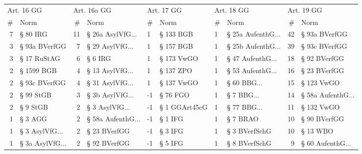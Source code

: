 \vspace{3mm}
\begin{tabular}{rlrlllllrl}
\toprule
\multicolumn{2}{l}{Art. 16 GG} & \multicolumn{2}{l}{Art. 16a GG} & \multicolumn{2}{l}{Art. 17 GG} & \multicolumn{2}{l}{Art. 18 GG} & \multicolumn{2}{l}{Art. 19 GG} \\
         \# &              Norm &           \# &                Norm &          \# &          Norm &          \# &                Norm &          \# &                Norm \\
\midrule
         7 &          § 80 IRG &          11 &  § 26a AsylVfG... &          1 &     § 133 BGB &          1 & § 25a AufenthG... &         42 &       § 93a BVerfGG \\
         3 &     § 93a BVerfGG &           7 &   § 29 AsylVfG... &          1 &     § 157 BGB &          1 & § 25b AufenthG... &         39 &       § 93c BVerfGG \\
         3 &       § 17 RuStAG &           6 &             § 6 IRG &          1 &    § 173 VwGO &          1 &  § 47 AufenthG... &         18 &        § 92 BVerfGG \\
         2 &        § 1599 BGB &           4 &   § 13 AsylVfG... &          1 &     § 137 ZPO &          1 &  § 53 AufenthG... &         16 &        § 23 BVerfGG \\
         2 &     § 93c BVerfGG &           4 &   § 31 AsylVfG... &          1 &    § 137 VwGO &          1 &       § 60 BBG... &         15 &          § 123 VwGO \\
         2 &         § 99 StGB &           3 &   § 3b AsylVfG... &         -1 &      § 76 FGO &          1 &        § 7 BBG... &         14 & § 58a AufenthG... \\
         2 &          § 9 StGB &           2 &    § 3 AsylVfG... &         -1 & § 1 GGArt45cG &          1 &       § 77 BBG... &         11 &          § 132 VwGO \\
         1 &           § 3 AGG &           2 & § 58a AufenthG... &         -1 &       § 1 IFG &          1 &            § 7 BRAO &         10 &        § 90 BVerfGG \\
         1 &  § 3 AsylVfG... &           2 &        § 23 BVerfGG &         -1 &       § 3 IFG &          1 &       § 3 BVerfSchG &         10 &            § 13 WBO \\
         1 & § 3a AsylVfG... &           2 &        § 92 BVerfGG &         -1 &       § 5 IFG &          1 &       § 8 BVerfSchG &          9 &  § 60 AufenthG... \\

\end{tabular}
